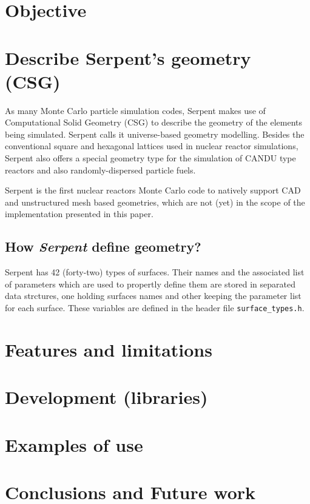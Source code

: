 \documentclass{elsarticle}
\begin{document}
\section{Objective}


\section{Describe Serpent's geometry (CSG)}

As many Monte Carlo particle simulation codes, Serpent makes use of Computational Solid Geometry (CSG) to
describe the geometry of the elements being simulated. Serpent calls it universe-based geometry modelling.
Besides the conventional square and hexagonal lattices used in nuclear reactor simulations, Serpent also
offers a special geometry type for the simulation of CANDU type reactors and also randomly-dispersed
particle fuels.

Serpent is the first nuclear reactors Monte Carlo code to natively support CAD and unstructured
mesh based geometries\cite{serpent-openfoam-mesh}, which are not (yet) in the scope of the implementation presented in this paper.

\subsection{How \textit{Serpent} define geometry?}

Serpent has 42 (forty-two) types of surfaces. Their names and the associated
list of parameters which are used to propertly define them are stored
in separated data strctures, one holding surfaces names and other keeping
the parameter list for each surface. These variables are defined in the
header file \texttt{surface\_types.h}.


\section{Features and limitations}

\section{Development (libraries)}

\section{Examples of use}

\section{Conclusions and Future work}



\end{document}

